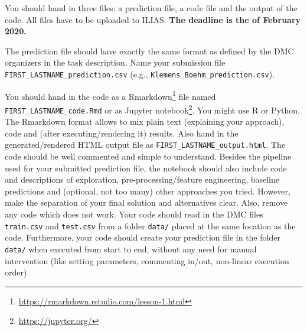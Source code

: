 \documentclass[headinclude,headsepline]{scrartcl}
\newcommand{\HandInDate}{\nth{29} of February 2020}
\begin{document}
You should hand in three files: a prediction file, a code file and the output of the code.
All files have to be uploaded to ILIAS.
\textbf{The deadline is the \HandInDate.}

The prediction file should have exactly the same format as defined by the DMC organizers in the task description.
Name your submission file \texttt{FIRST\_LASTNAME\_prediction.csv} (e.g., \texttt{Klemens\_Boehm\_prediction.csv}).

You should hand in the code as a Rmarkdown\footnote{\url{https://rmarkdown.rstudio.com/lesson-1.html}} file named \texttt{FIRST\_LASTNAME\_code.Rmd} or as Jupyter notebook\footnote{\url{https://jupyter.org/}}.
You might use R or Python.
The Rmarkdown format allows to mix plain text (explaining your approach), code and (after executing/rendering it) results.
Also hand in the generated/rendered HTML output file as \texttt{FIRST\_LASTNAME\_output.html}.
The code should be well commented and simple to understand.
Besides the pipeline used for your submitted prediction file, the notebook should also include code and descriptions of exploration, pre-processing/feature engineering, baseline predictions and (optional, not too many) other approaches you tried.
However, make the separation of your final solution and alternatives clear.
Also, remove any code which does not work.
Your code should read in the DMC files \texttt{train.csv} and \texttt{test.csv} from a folder \texttt{data/} placed at the same location as the code.
Furthermore, your code should create your prediction file in the folder \texttt{data/} when executed from start to end, without any need for manual intervention (like setting parameters, commenting in/out, non-linear execution order).
\end{document}
